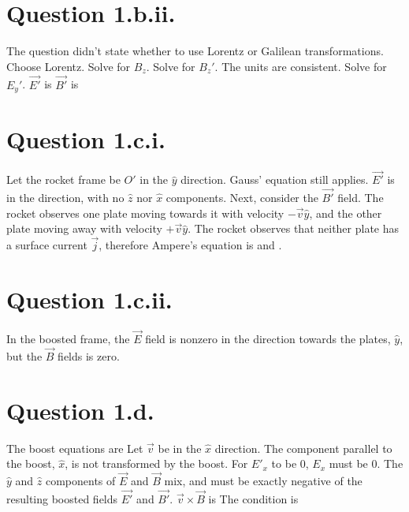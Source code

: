 \documentclass{article}
\begin{document}
\section{Question 1.b.ii.}
The question didn't state whether to use Lorentz or Galilean transformations. Choose Lorentz. Solve for $B_z$.
Solve for $B_z'$.
The units are consistent.
Solve for $E_y'$.
$\vec{E'}$ is
$\vec{B'}$ is

\section{Question 1.c.i.}
Let the rocket frame be $O'$ in the $\hat{y}$ direction. Gauss' equation still applies. $\vec{E'}$ is in the  direction, with no $\hat{z}$ nor $\hat{x}$ components. Next, consider the $\vec{B'}$ field. The rocket observes one plate moving towards it with velocity $-\vec{v}\hat{y}$, and the other plate moving away with velocity $+\vec{v}\hat{y}$. The rocket observes that neither plate has a surface current $\vec{j}$, therefore Ampere's equation is
and .

\section{Question 1.c.ii.}
In the boosted frame, the $\vec{E}$ field is nonzero in the direction towards the plates, $\hat{y}$, but the $\vec{B}$ fields is zero.

\section{Question 1.d.}The boost equations are
Let $\vec{v}$ be in the $\hat{x}$ direction. The component parallel to the boost, $\hat{x}$, is not transformed by the boost. For $E'_x$ to be 0, $E_x$ must be 0. The $\hat{y}$ and $\hat{z}$ components of $\vec{E}$ and $\vec{B}$ mix, and must be exactly negative of the resulting boosted fields $\vec{E'}$ and $\vec{B'}$. $\vec{v}\times \vec{B}$ is
The condition is
\end{document}
